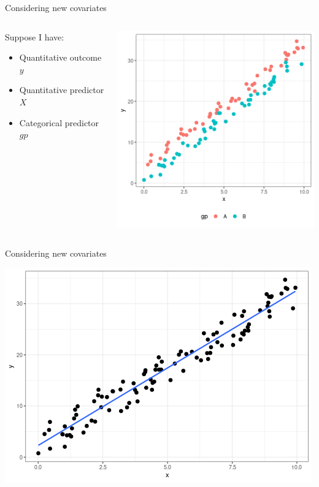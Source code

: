 \documentclass{beamer}
\begin{document}
\begin{frame}{Considering new covariates}


\begin{columns}

  \begin{column}{0.45\textwidth}
  Suppose I have:
  \begin{itemize}
  \item Quantitative outcome $y$
  \item Quantitative predictor $X$
  \item Categorical predictor $gp$
  \end{itemize}
  \end{column}
  \begin{column}{0.45\textwidth}
\begin{center}
\includegraphics[scale=0.45]{color_cat.png}
\end{center}
  \end{column}

\end{columns}

\end{frame}

\begin{frame}{Considering new covariates}
\begin{center}
\includegraphics[scale=0.5]{miss_cat.png}
\end{center}
\end{frame}
\end{document}
